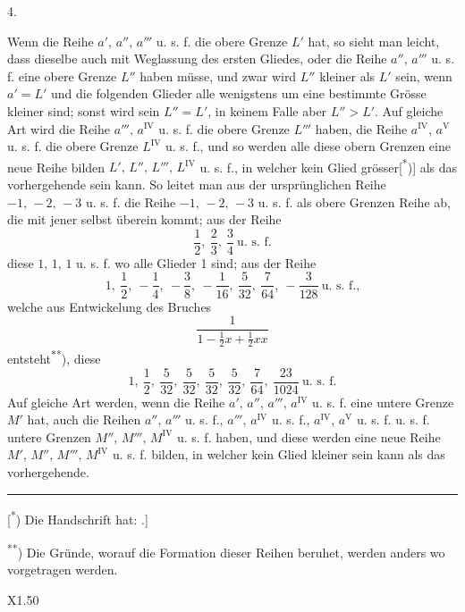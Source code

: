 \clearpage{}
\begingroup
\makeatletter\tagsleft@true\let\veqno\@@leqno\makeatother
\begin{center}4.\end{center}
\noindent\hspace*{\parindent}Wenn die Reihe \(a',\,a'',\,a'''\) u. s. f. die obere Grenze \(L'\) hat, so sieht man leicht, dass dieselbe auch mit Weglassung des ersten Gliedes, oder die Reihe \(a'',\,a'''\) u. s. f. eine obere Grenze \(L''\) haben müsse, und zwar wird \(L''\) kleiner als \(L'\) sein, wenn \(a'=L'\) und die folgenden Glieder alle wenigstens um eine bestimmte Grösse kleiner sind; sonst wird sein \(L''=L'\), in keinem Falle aber \(L''>L'\). Auf gleiche Art wird die Reihe \(a''',\,a^{\mathrm{IV}}\) u. s. f. die obere Grenze \(L'''\) haben, die Reihe \(a^{\mathrm{IV}},\,a^{\mathrm{V}}\) u. s. f. die obere Grenze \(L^{\mathrm{IV}}\) u. s. f., und so werden alle diese obern Grenzen eine neue Reihe bilden \(L',\,L'',\,L''',\,L^{\mathrm{IV}}\) u. s. f., in welcher kein Glied grösser[\textsuperscript{*})] als das vorhergehende sein kann. So leitet man aus der ursprünglichen Reihe \(-1,\,-2,\,-3\) u. s. f. die Reihe \(-1,\,-2,\,-3\) u. s. f. als obere Grenzen Reihe ab, die mit jener selbst überein kommt; aus der Reihe
\[
\frac12,\ \frac23,\ \frac34\ \text{u. s. f.}
\]
\noindent diese \(1,\,1,\,1\) u. s. f. wo alle Glieder 1 sind; aus der Reihe
\begin{equation}
1,\ \frac12,\ -\frac14,\ -\frac38,\ -\frac1{16},\ \frac5{32},\ \frac7{64},\ -\frac3{128}\ \text{u. s. f.,}\tag*{[1]}
\end{equation}
\noindent welche aus Entwickelung des Bruches
\begin{equation}
\frac1{1-\frac12x+\frac12xx}\tag*{[2]}
\end{equation}
\noindent entsteht\textsuperscript{**}), diese
\[
1,\ \frac12,\ \frac5{32},\ \frac5{32},\ \frac5{32},\ \frac5{32},\ \frac7{64},\ \frac{23}{1024}\ \text{u. s. f.}
\]
\noindent Auf gleiche Art werden, wenn die Reihe \(a',\,a'',\,a''',\,a^{\mathrm{IV}}\) u. s. f. eine untere Grenze \(M'\) hat, auch die Reihen \(a'',\,a'''\) u. s. f., \(a''',\,a^{\mathrm{IV}}\) u. s. f., \(a^{\mathrm{IV}},\,a^{\mathrm{V}}\) u. s. f. u. s. f. untere Grenzen \(M'',\,M''',\,M^{\mathrm{IV}}\) u. s. f. haben, und diese werden eine neue Reihe \(M',\,M'',\,M''',\,M^{\mathrm{IV}}\) u. s. f. bilden, in welcher kein Glied kleiner sein kann als das vorhergehende.
\par\medskip\noindent\rule{.24\linewidth}{.4pt}\par\smallskip
{\small
\noindent\hspace*{\parindent}[\textsuperscript{*}) Die Handschrift hat: .]
\par\noindent\hspace*{\parindent}\textsuperscript{**}) Die Gründe, worauf die Formation dieser Reihen beruhet, werden anders wo vorgetragen werden.
\par}
\par\smallskip\noindent X1.\hfill50
\clearpage\endgroup

